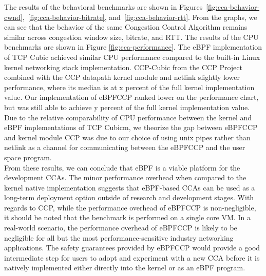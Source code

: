 \documentclass[../main.tex]{subfiles}
\begin{document}
The results of the behavioral benchmarks are shown in Figures~\ref{fig:cca-behavior-cwnd},~\ref{fig:cca-behavior-bitrate}, and~\ref{fig:cca-behavior-rtt}. From the graphs, we can see that the behavior of the same Congestion Control Algorithm remains similar across congestion window size, bitrate, and RTT. The results of the CPU benchmarks are shown in Figure \ref{fig:cca-performance}. The eBPF implementation of TCP Cubic achieved similar CPU performance compared to the built-in Linux kernel networking stack implementation. CCP-Cubic from the CCP Project \cite{generic-cong-avoid} combined with the CCP datapath kernel module and netlink slightly lower performance, where its median is at x percent of the full kernel implementation value. Our implementation of eBPFCCP ranked lower on the performance chart, but was still able to achieve y percent of the full kernel implementation value. Due to the relative comparability of CPU performance between the kernel and eBPF implementations of TCP Cubicm, we theorize the gap between eBPFCCP and kernel module CCP was due to our choice of using unix pipes rather than netlink as a channel for communicating between the eBPFCCP and the user space program. \\
From these results, we can conclude that eBPF is a viable platform for the development CCAs. The minor performance overhead when compared to the kernel native implementation suggests that eBPF-based CCAs can be used as a long-term deployment option outside of research and development stages. With regards to CCP, while the performance overhead of eBPFCCP is non-negligible, it should be noted that the benchmark is performed on a single core VM. In a real-world scenario, the performance overhead of eBPFCCP is likely to be negligible for all but the most performance-sensitive industry networking applications. The safety guarantees provided by eBPFCCP would provide a good intermediate step for users to adopt and experiment with a new CCA before it is natively implemented either directly into the kernel or as an eBPF program. 
\end{document}
